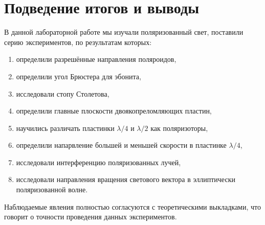 \documentclass[a4paper,12pt]{article} %
\begin{document}
\section{Подведение итогов и выводы}

В данной лабораторной работе мы изучали поляризованный свет, поставили серию экспериментов, по результатам которых:
\begin{enumerate}
    \item определили разрешённые направления поляроидов,
    \item определили угол Брюстера для эбонита,
    \item исследовали стопу Столетова,
    \item определили главные плоскости двоякопреломляющих пластин,
    \item научились различать пластинки $\lambda/4$ и $\lambda/2$ как поляризоторы,
    \item определили напарвление большей и меньшей скорости в пластинке $\lambda/4$,
    \item исследовали интерференцию поляризованных лучей,
    \item исследовали направления вращения светового вектора в эллиптически поляризованной волне.
\end{enumerate}

Наблюдаемые явления полностью согласуются с теоретическими выкладками, что говорит о точности проведения данных экспериментов. 
\end{document}
